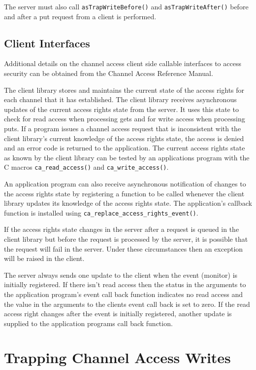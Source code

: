 The server must also call \verb|asTrapWriteBefore()| and \verb|asTrapWriteAfter()| before and after a put request from a client is performed.

\subsection{Client Interfaces}

Additional details on the channel access client side callable interfaces to access security can be obtained from the Channel Access Reference Manual.

The client library stores and maintains the current state of the access rights for each channel that it has established.
The client library receives asynchronous updates of the current access rights state from the server.
It uses this state to check for read access when processing gets and for write access when processing puts.
If a program issues a channel access request that is inconsistent with the client library's current knowledge of the access rights state, the access is denied and an error code is returned to the application.
The current access rights state as known by the client library can be tested by an applications program with the C macros \verb|ca_read_access()| and \verb|ca_write_access()|.

An application program can also receive asynchronous notification of changes to the access rights state by registering a function to be called whenever the client library updates its knowledge of the access rights state.
The application's callback function is installed using \verb|ca_replace_access_rights_event()|.

If the access rights state changes in the server after a request is queued in the client library but before the request is processed by the server, it is possible that the request will fail in the server.
Under these circumstances then an exception will be raised in the client.

The server always sends one update to the client when the event (monitor) is initially registered.
If there isn't read access then the status in the arguments to the application program's event call back function indicates no read access and the value in the arguments to the clients event call back is set to zero.
If the read access right changes after the event is initially registered, another update is supplied to the application programs call back function.

\section{Trapping Channel Access Writes}

